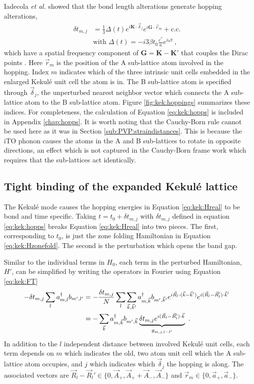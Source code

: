 Iadecola \textit{et al.} showed that the bond length alterations generate hopping alterations,
\begin{align}
	\delta t_{m,j}&=\frac{1}{3} \Delta(t) e^{i \bm{K} \cdot \vec{\delta}_j} e^{i \bm{G} \cdot \vec{r}_{m}}+\text{c.c.} \nonumber \\
	& \text{with } \Delta(t)=-i 3 \beta t_0 \frac{c^*}{a} e^{i \omega t} \label{eq:kek:hopps} \ ,
\end{align}
which have a spatial frequency component of $\bm{G}=\bm{K}-\bm{K'}$ that couples the Dirac points \cite{Iadecola2013}.
Here $\vec{r}_{m}$ is the position of the A sub-lattice atom involved in the hopping.
Index $m$ indicates which of the three intrinsic unit cells embedded in the enlarged Kekul\'e unit cell the atom is in.
The B sub-lattice atom is specified through $\vec{\delta}_j$, the unperturbed nearest neighbor vector which connects the A sub-lattice atom to the B sub-lattice atom.
Figure \ref{fig:kek:hoppings} summarizes these indices.
For completeness, the calculation of Equation \ref{eq:kek:hopps} is included in Appendix \ref{chap:hopps}.
It is worth noting that the Cauchy-Born rule cannot be used here as it was in Section \ref{sub:PVP:straindistances}.
This is because the iTO phonon causes the atoms in the A and B sub-lattices to rotate in opposite directions, an effect which is not captured in the Cauchy-Born frame work which requires that the sub-lattices act identically.

\subsection{Tight binding of the expanded Kekul\'e lattice}
The Kekul\'e mode causes the hopping energies in Equation \ref{eq:kek:Hreal} to be bond and time specific.
Taking $t=t_0+\delta t_{m,j}$ with $\delta t_{m,j}$ defined in equation \ref{eq:kek:hopps} breaks Equation \ref{eq:kek:Hreal} into two pieces.
The first, corresponding to $t_0$, is just the zone folding Hamiltonian in Equation \ref{eq:kek:Hzonefold}.
The second is the perturbation which opens the band gap.

Similar to the individual terms in $H_0$, each term in the perturbed Hamiltonian, $H'$, can be simplified by writing the operators in Fourier using Equation \ref{eq:kek:FT} 
\begin{align*}
	-  \delta t_{m,j} \sum_{l} a^{\dagger}_{m,l} b_{m',l'} &= 
	    -\frac{\delta t_{m,j}}{N}\sum_l \sum_{\vec{k},\vec{k}'} a^{\dagger}_{m,\vec{k}} b_{m',\vec{k}'} 
	    e^{i \vec{R}_l \cdot (\vec{k}-\vec{k}')} e^{i(\vec{R}_l-\vec{R}_l')\cdot \vec{k}'} \\
	    &=- \sum_{\vec{k}} a^{\dagger}_{m,\vec{k}} b_{m',\vec{k}} 
	    	\underbrace{ \delta t_{m,j}  e^{i(\vec{R}_l-\vec{R}_l')\cdot \vec{k}}}_{g_{m,j,l-l'}} \ .
\end{align*}
In addition to the $l$ independent distance between involved Kekul\'e unit cells, each term depends on $m$ which indicates the old, two atom unit cell which the A sub-lattice atom occupies, and $j$ which indicates which $\vec{\delta}_j$ the hopping is along.
The associated vectors are $\vec{R}_l-\vec{R}_l' \in \{ 0, \vec{A}_+, \vec{A}_+ +\vec{A}_-,\vec{A}_- \}$ and $\vec{r}_m \in \{ 0, \vec{a}_+,\vec{a}_- \}$.

